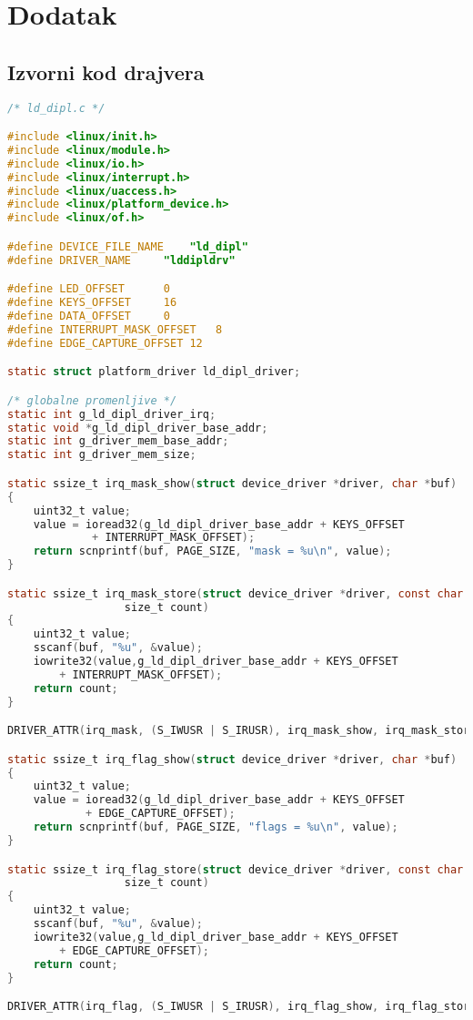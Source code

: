 \section{Dodatak}
\subsection{Izvorni kod drajvera}
\begin{lstlisting}[language=C]
/* ld_dipl.c */

#include <linux/init.h>
#include <linux/module.h>
#include <linux/io.h>
#include <linux/interrupt.h>
#include <linux/uaccess.h>
#include <linux/platform_device.h>
#include <linux/of.h>

#define DEVICE_FILE_NAME	"ld_dipl"
#define DRIVER_NAME		"lddipldrv"

#define LED_OFFSET		0
#define KEYS_OFFSET		16
#define DATA_OFFSET		0
#define INTERRUPT_MASK_OFFSET	8
#define EDGE_CAPTURE_OFFSET	12

static struct platform_driver ld_dipl_driver;

/* globalne promenljive */
static int g_ld_dipl_driver_irq;
static void *g_ld_dipl_driver_base_addr;
static int g_driver_mem_base_addr;
static int g_driver_mem_size;

static ssize_t irq_mask_show(struct device_driver *driver, char *buf)
{	
	uint32_t value;
	value = ioread32(g_ld_dipl_driver_base_addr + KEYS_OFFSET
			 + INTERRUPT_MASK_OFFSET);
	return scnprintf(buf, PAGE_SIZE, "mask = %u\n", value);
}

static ssize_t irq_mask_store(struct device_driver *driver, const char *buf,
			      size_t count)
{
	uint32_t value;
	sscanf(buf, "%u", &value);
	iowrite32(value,g_ld_dipl_driver_base_addr + KEYS_OFFSET
		+ INTERRUPT_MASK_OFFSET);
	return count;
}

DRIVER_ATTR(irq_mask, (S_IWUSR | S_IRUSR), irq_mask_show, irq_mask_store);

static ssize_t irq_flag_show(struct device_driver *driver, char *buf)
{
	uint32_t value;
	value = ioread32(g_ld_dipl_driver_base_addr + KEYS_OFFSET
			+ EDGE_CAPTURE_OFFSET);
	return scnprintf(buf, PAGE_SIZE, "flags = %u\n", value);
}

static ssize_t irq_flag_store(struct device_driver *driver, const char *buf,
			      size_t count)
{
	uint32_t value;
	sscanf(buf, "%u", &value);
	iowrite32(value,g_ld_dipl_driver_base_addr + KEYS_OFFSET
		+ EDGE_CAPTURE_OFFSET);
	return count;
}

DRIVER_ATTR(irq_flag, (S_IWUSR | S_IRUSR), irq_flag_show, irq_flag_store);


\end{lstlisting}
